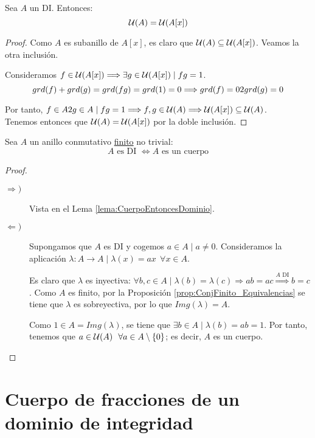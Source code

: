 \begin{prop}
    Sea $A$ un DI. Entonces:
    $$\mathcal{U}(A) = \mathcal{U}(A[x])$$
\end{prop}
\begin{proof}
    Como $A$ es subanillo de $A[x]$, es claro que $\mathcal{U}(A) \subseteq \mathcal{U}(A[x])$. Veamos la otra inclusión.
    
    Consideramos $f \in \mathcal{U}(A[x]) \Longrightarrow \exists g \in \mathcal{U}(A[x]) \mid fg = 1$.
    $$grd(f) + grd(g) = grd(fg) = grd(1) = 0 \Longrightarrow grd(f) = 0 2 grd(g) = 0$$
    
    Por tanto, $f \in A 2 g \in A \mid fg = 1 \Longrightarrow f,g \in \mathcal{U}(A) \Longrightarrow \mathcal{U}(A[x]) \subseteq \mathcal{U}(A)$.\\
    
    Tenemos entonces que $\mathcal{U}(A) = \mathcal{U}(A[x])$ por la doble inclusión.
\end{proof}

\begin{prop}
    Sea $A$ un anillo conmutativo \ul{finito} no trivial:
    $$A \mbox{ es DI } \Longleftrightarrow A \mbox{ es un cuerpo}$$
\end{prop}
\begin{proof}\
\begin{description}
    \item[$\Longrightarrow)$] Vista en el Lema \ref{lema:CuerpoEntoncesDominio}.

    \item[$\Longleftarrow)$] Supongamos que $A$ es DI y cogemos $a \in A \mid a \neq 0$. Consideramos la aplicación $\lambda:A\rightarrow A \mid \lambda(x) = ax~~\forall x \in A$.
    
    Es claro que $\lambda$ es inyectiva: $\forall b,c \in A \mid \lambda(b) = \lambda(c) \Longrightarrow ab = ac \stackrel{\text{$A$ DI}}{\Longrightarrow} b=c$.
    Como $A$ es finito, por la Proposición \ref{prop:ConjFinito_Equivalencias} se tiene que $\lambda$ es sobreyectiva, por lo que $Img(\lambda)=A$.

    Como $1 \in A = Img(\lambda)$, se tiene que $\exists b \in A \mid \lambda(b) = ab = 1$. Por tanto, tenemos que $ a \in \mathcal{U}(A)~~\forall a \in A \setminus \{0\}$; es decir, $A$ es un cuerpo.
\end{description}
\end{proof}

\section{Cuerpo de fracciones de un dominio de integridad}

